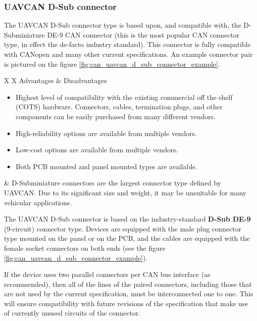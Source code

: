 \clearpage  %
\subsubsection{UAVCAN D-Sub connector}

The UAVCAN D-Sub connector type is based upon, and compatible with, the D-Subminiature DE-9 CAN connector
(this is the most popular CAN connector type, in effect the de-facto industry standard).
This connector is fully compatible with CANopen and many other current specifications.
An example connector pair is pictured on the figure \ref{fig:can_uavcan_d_sub_connector_example}.

{
\NoLeftSkip
\begin{UAVCANCompactTable}{X X}
    Advantages & Disadvantages \\
    \begin{itemize}
        \item Highest level of compatibility with the existing commercial off the shelf (COTS) hardware.
        Connectors, cables, termination plugs, and other components can be easily purchased from many different vendors.
        \item High-reliability options are available from multiple vendors.
        \item Low-cost options are available from multiple vendors.
        \item Both PCB mounted and panel mounted types are available.
    \end{itemize}
    &
    D-Subminiature connectors are the largest connector type defined by UAVCAN.
    Due to its significant size and weight, it may be unsuitable for many vehicular applications.
\end{UAVCANCompactTable}
}

The UAVCAN D-Sub connector is based on the industry-standard \textbf{D-Sub DE-9} (9-circuit) connector type.
Devices are equipped with the male plug connector type mounted on the panel or on the PCB,
and the cables are equipped with the female socket connectors on both ends
(see the figure \ref{fig:can_uavcan_d_sub_connector_example}).

If the device uses two parallel connectors per CAN bus interface (as recommended),
then all of the lines of the paired connectors,
including those that are not used by the current specification,
must be interconnected one to one.
This will ensure compatibility with future revisions of the specification that make use of
currently unused circuits of the connector.

